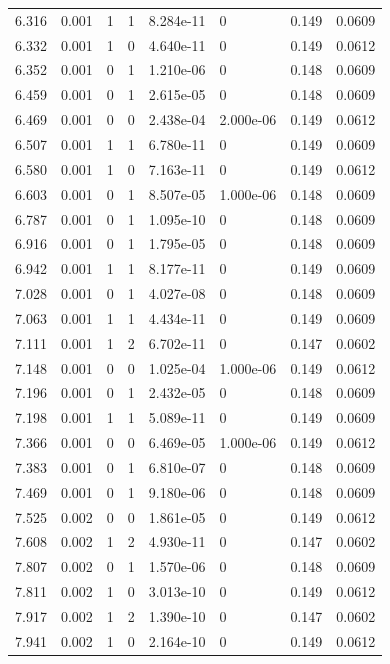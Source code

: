 \documentclass[preview]{standalone}
\begin{document}
{{{\begin{tabular}{L{1.2cm}C{1.2cm} C{0.3cm}C{0.5cm} C{1.4cm}C{1.4cm} C{1.4cm}C{1.4cm}}
  6.316  &  0.001  & 1     &  1 &  8.284e-11  & 0  & 0.149 &  0.0609   \\ 
  6.332  &  0.001  & 1     &  0 &  4.640e-11  & 0  & 0.149 &  0.0612   \\ 
  6.352  &  0.001  & 0     &  1 &  1.210e-06  & 0  & 0.148 &  0.0609   \\ 
  6.459  &  0.001  & 0     &  1 &  2.615e-05  & 0  & 0.148 &  0.0609   \\ 
  6.469  &  0.001  & 0     &  0 &  2.438e-04  & 2.000e-06  & 0.149 &  0.0612   \\ 
  6.507  &  0.001  & 1     &  1 &  6.780e-11  & 0  & 0.149 &  0.0609   \\ 
  6.580  &  0.001  & 1     &  0 &  7.163e-11  & 0  & 0.149 &  0.0612   \\ 
  6.603  &  0.001  & 0     &  1 &  8.507e-05  & 1.000e-06  & 0.148 &  0.0609   \\ 
  6.787  &  0.001  & 0     &  1 &  1.095e-10  & 0  & 0.148 &  0.0609   \\ 
  6.916  &  0.001  & 0     &  1 &  1.795e-05  & 0  & 0.148 &  0.0609   \\ 
  6.942  &  0.001  & 1     &  1 &  8.177e-11  & 0  & 0.149 &  0.0609   \\ 
  7.028  &  0.001  & 0     &  1 &  4.027e-08  & 0  & 0.148 &  0.0609   \\ 
  7.063  &  0.001  & 1     &  1 &  4.434e-11  & 0  & 0.149 &  0.0609   \\ 
  7.111  &  0.001  & 1     &  2 &  6.702e-11  & 0  & 0.147 &  0.0602   \\ 
  7.148  &  0.001  & 0     &  0 &  1.025e-04  & 1.000e-06  & 0.149 &  0.0612   \\ 
  7.196  &  0.001  & 0     &  1 &  2.432e-05  & 0  & 0.148 &  0.0609   \\ 
  7.198  &  0.001  & 1     &  1 &  5.089e-11  & 0  & 0.149 &  0.0609   \\ 
  7.366  &  0.001  & 0     &  0 &  6.469e-05  & 1.000e-06  & 0.149 &  0.0612   \\ 
  7.383  &  0.001  & 0     &  1 &  6.810e-07  & 0  & 0.148 &  0.0609   \\ 
  7.469  &  0.001  & 0     &  1 &  9.180e-06  & 0  & 0.148 &  0.0609   \\ 
  7.525  &  0.002  & 0     &  0 &  1.861e-05  & 0  & 0.149 &  0.0612   \\ 
  7.608  &  0.002  & 1     &  2 &  4.930e-11  & 0  & 0.147 &  0.0602   \\ 
  7.807  &  0.002  & 0     &  1 &  1.570e-06  & 0  & 0.148 &  0.0609   \\ 
  7.811  &  0.002  & 1     &  0 &  3.013e-10  & 0  & 0.149 &  0.0612   \\ 
  7.917  &  0.002  & 1     &  2 &  1.390e-10  & 0  & 0.147 &  0.0602   \\ 
  7.941  &  0.002  & 1     &  0 &  2.164e-10  & 0  & 0.149 &  0.0612   \\ 
\hline 
\end{tabular} 

}}}
\end{document}
